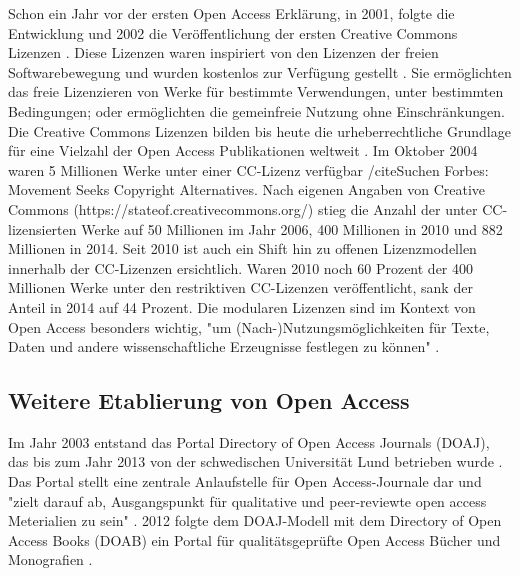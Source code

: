 Schon ein Jahr vor der ersten Open Access Erklärung, in 2001, folgte die Entwicklung und 2002 die Veröffentlichung der ersten Creative Commons Lizenzen \cite{garcia_2010_open}. Diese Lizenzen waren inspiriert von den Lizenzen der freien Softwarebewegung und wurden kostenlos zur Verfügung gestellt \cite{Minjeong_2007}. Sie ermöglichten das freie Lizenzieren von Werke für bestimmte Verwendungen, unter bestimmten Bedingungen; oder ermöglichten die gemeinfreie Nutzung ohne Einschränkungen. Die Creative Commons Lizenzen bilden bis heute die urheberrechtliche Grundlage für eine Vielzahl der Open Access Publikationen weltweit \cite{suchen}. Im Oktober 2004 waren 5 Millionen Werke unter einer CC-Lizenz verfügbar /cite{Suchen Forbes: Movement Seeks Copyright Alternatives}. Nach eigenen Angaben von Creative Commons (https://stateof.creativecommons.org/) stieg die Anzahl der unter CC-lizensierten Werke auf 50 Millionen im Jahr 2006, 400 Millionen in 2010 und 882 Millionen in 2014. Seit 2010 ist auch ein Shift hin zu offenen Lizenzmodellen innerhalb der CC-Lizenzen ersichtlich. Waren 2010 noch 60 Prozent der 400 Millionen Werke unter den restriktiven CC-Lizenzen veröffentlicht, sank der Anteil in 2014 auf 44 Prozent. Die modularen Lizenzen sind im Kontext von Open Access besonders wichtig, "um (Nach-)Nutzungsmöglichkeiten für Texte, Daten und andere wissenschaftliche Erzeugnisse festlegen zu können" \cite{suchen-Hoffmann-Zugang-undVerwertung-oeffentlicher-Informationen}.

\subsection{Weitere Etablierung von Open Access}

Im Jahr 2003 entstand das Portal Directory of Open Access Journals (DOAJ), das bis zum Jahr 2013 von der schwedischen Universität Lund betrieben wurde \cite{doaj_2015_about}. Das Portal stellt eine zentrale Anlaufstelle für Open Access-Journale dar \cite{suber_2015} und "zielt darauf ab, Ausgangspunkt für qualitative und peer-reviewte open access Meterialien zu sein" \cite{doaj_2015_about}. 2012 folgte dem DOAJ-Modell mit dem Directory of Open Access Books (DOAB) ein Portal für qualitätsgeprüfte Open Access Bücher und Monografien \cite{adema_2013_political}.

